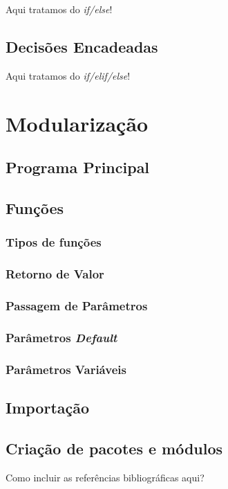 \documentclass[
]{book}
\begin{document}
Aqui tratamos do \emph{if/else}!

\hypertarget{decis-if-elif-else}{%
\section{Decisões Encadeadas}\label{decis-if-elif-else}}

Aqui tratamos do \emph{if/elif/else}!

\hypertarget{modul}{%
\chapter{Modularização}\label{modul}}

\hypertarget{modul-main}{%
\section{Programa Principal}\label{modul-main}}

\hypertarget{modul-funcao}{%
\section{Funções}\label{modul-funcao}}

\hypertarget{modul-funcao-tipos}{%
\subsection{Tipos de funções}\label{modul-funcao-tipos}}

\hypertarget{modul-funcao-return}{%
\subsection{Retorno de Valor}\label{modul-funcao-return}}

\hypertarget{modul-funcao-param}{%
\subsection{Passagem de Parâmetros}\label{modul-funcao-param}}

\hypertarget{modul-funcao-default}{%
\subsection{\texorpdfstring{Parâmetros \emph{Default}}{Parâmetros Default}}\label{modul-funcao-default}}

\hypertarget{modul-funcao-var}{%
\subsection{Parâmetros Variáveis}\label{modul-funcao-var}}

\hypertarget{modul-import}{%
\section{Importação}\label{modul-import}}

\hypertarget{modul-packa}{%
\section{Criação de pacotes e módulos}\label{modul-packa}}

Como incluir as referências bibliográficas aqui?

  
\end{document}
